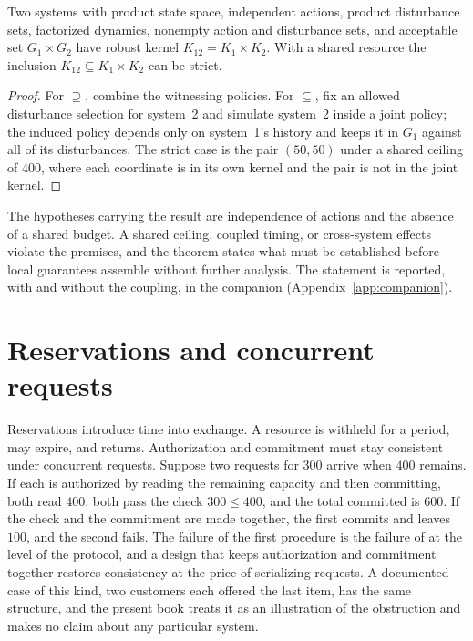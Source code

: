 \begin{theorem}\label{thm:P10}
Two systems with product state space, independent actions, product disturbance sets, factorized dynamics, nonempty action and disturbance sets, and acceptable set $G_1\times G_2$ have robust kernel $K_{12}=K_1\times K_2$. With a shared resource the inclusion $K_{12}\subseteq K_1\times K_2$ can be strict.
\end{theorem}

\begin{proof}
For $\supseteq$, combine the witnessing policies. For $\subseteq$, fix an allowed disturbance selection for system~2 and simulate system~2 inside a joint policy; the induced policy depends only on system~1's history and keeps it in $G_1$ against all of its disturbances. The strict case is the pair $(50,50)$ under a shared ceiling of $400$, where each coordinate is in its own kernel and the pair is not in the joint kernel.
\end{proof}

The hypotheses carrying the result are independence of actions and the absence of a shared budget. A shared ceiling, coupled timing, or cross-system effects violate the premises, and the theorem states what must be established before local guarantees assemble without further analysis. The statement is reported, with and without the coupling, in the companion (Appendix~\ref{app:companion}).

\section{Reservations and concurrent requests}

Reservations introduce time into exchange. A resource is withheld for a period, may expire, and returns. Authorization and commitment must stay consistent under concurrent requests. Suppose two requests for $300$ arrive when $400$ remains. If each is authorized by reading the remaining capacity and then committing, both read $400$, both pass the check $300\le 400$, and the total committed is $600$. If the check and the commitment are made together, the first commits and leaves $100$, and the second fails. The failure of the first procedure is the failure of  at the level of the protocol, and a design that keeps authorization and commitment together restores consistency at the price of serializing requests. A documented case of this kind, two customers each offered the last item, has the same structure, and the present book treats it as an illustration of the obstruction and makes no claim about any particular system.

